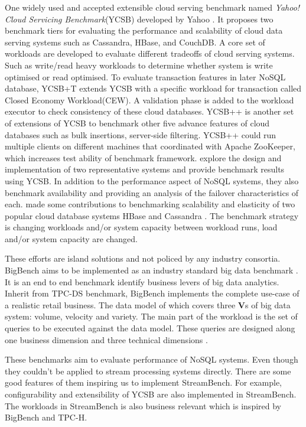 One widely used and accepted extensible cloud serving benchmark named \textit{Yahoo! Cloud Servicing Benchmark}(YCSB) developed by Yahoo \cite{YCSB}. It proposes two benchmark tiers for evaluating the performance and scalability of cloud data serving systems such as Cassandra, HBase, and CouchDB. A core set of workloads are developed to evaluate different tradeoffs of cloud serving systems. Such as write/read heavy workloads to determine whether system is write optimised or read optimised. To evaluate transaction features in later NoSQL database, YCSB+T \cite{dey2014ycsb+t} extends YCSB with a specific workload for transaction called Closed Economy Workload(CEW). A validation phase is added to the workload executor to check consistency of these cloud databases. YCSB++ \cite{ycsb++} is another set of extensions of YCSB to benchmark other five advance features of cloud databases such as bulk insertions, server-side filtering. YCSB++ could run multiple clients on different machines that coordinated with Apache ZooKeeper, which increases test ability of benchmark framework. \citet{pokludabenchmarking}  explore the design and implementation of two representative systems and provide benchmark results using YCSB. In addition to the performance aspect of NoSQL systems, they also benchmark availability and providing an analysis of the failover characteristics of each. \citeauthor{Kuhlenkamp} made some contributions to benchmarking scalability and elasticity of two popular cloud database systems HBase and Cassandra \cite{Kuhlenkamp}. The benchmark strategy is changing workloads and/or system capacity between workload runs, load and/or system capacity are changed.

These efforts are island solutions and not policed by any industry consortia. BigBench aims to be implemented as an industry standard big data benchmark \cite{BigBench}. It is an end to end benchmark identify business levers of big data analytics. Inherit from TPC-DS benchmark, BigBench implements the complete use-case of a realistic retail business. The data model of which covers three \textbf{V}s of big data system: volume, velocity and variety. The main part of the workload is the set of queries to be executed against the data model. These queries are designed along one business dimension and three technical dimensions \cite{BigBench}.

These benchmarks aim to evaluate performance of NoSQL systems. Even though they couldn't be applied to stream processing systems directly. There are some good features of them inspiring us to implement StreamBench. For example, configurability and extensibility of YCSB are also implemented in StreamBench. The workloads in StreamBench is also business relevant which is inspired by BigBench and TPC-H.

